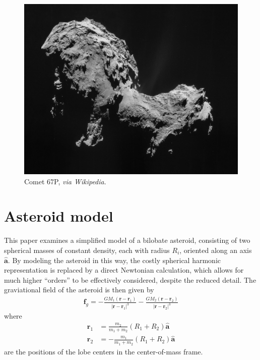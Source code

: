 \documentclass{article}
\newcommand{\uvec}[1]{\boldsymbol{\hat{\textbf{#1}}}}
\begin{document}
\begin{multicols}{2}
\begin{figure}[H]
	\centering
	\includegraphics[width=0.8\linewidth]{comet}
	\caption{Comet 67P, \textit{via Wikipedia}.}
	\label{fig:67P}
\end{figure}

\section*{Asteroid model}
This paper examines a simplified model of a bilobate asteroid, consisting of two spherical masses of constant density, each with radius $R_{i}$, oriented along an axis $\uvec{a}$. By modeling the asteroid in this way, the costly spherical harmonic representation is replaced by a direct Newtonian calculation, which allows for much higher ``orders'' to be effectively considered, despite the reduced detail. The graviational field of the asteroid is then given by
\begin{align*}
	\mathbf{f}_{g} = -\frac{GM_{1}(\mathbf{r} - \mathbf{r}_{1})}{|\mathbf{r} - \mathbf{r}_{1}|^{3}} - \frac{GM_{2}(\mathbf{r} - \mathbf{r}_{2})}{|\mathbf{r} - \mathbf{r}_{2}|^{3}}
\end{align*}
where
\begin{align*}
	\mathbf{r}_{1} &= \frac{m_{2}}{m_{1} + m_{2}}(R_{1} + R_{2})\uvec{a}\\
	\mathbf{r}_{2} &= -\frac{m_{1}}{m_{1} + m_{2}}(R_{1} + R_{2})\uvec{a}
\end{align*}
are the positions of the lobe centers in the center-of-mass frame.


\end{multicols}
\end{document}
